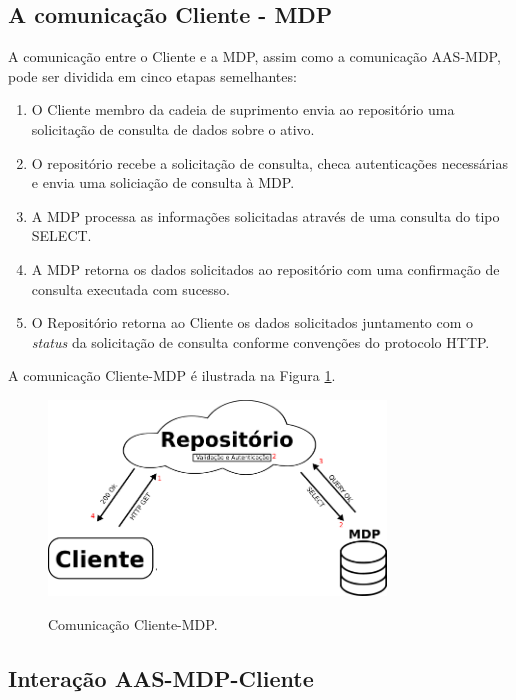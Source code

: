 \documentclass[
	12pt,				%
	oneside,			%
	a4paper,			%
	english,			%
	brazil				%
]{abntex2}
\begin{document}
	
	\subsection{A comunicação Cliente - MDP}
	
	A comunicação entre o Cliente e a MDP, assim como a comunicação AAS-MDP, pode ser dividida em cinco etapas semelhantes:
	
	\begin{enumerate}
		\item O Cliente membro da cadeia de suprimento envia ao repositório uma solicitação de consulta de dados sobre o ativo.
		\item O repositório recebe a solicitação de consulta, checa autenticações necessárias e envia uma soliciação de consulta à MDP.
		\item A MDP processa as informações solicitadas através de uma consulta do tipo SELECT.
		\item A MDP retorna os dados solicitados ao repositório com uma confirmação de consulta executada com sucesso.
		\item O Repositório retorna ao Cliente os dados solicitados juntamento com o \textit{status} da solicitação de consulta conforme convenções do protocolo HTTP.
	\end{enumerate}
	
	
	A comunicação Cliente-MDP é ilustrada na Figura \ref{fig:cliente-mdp}.
	
	\begin{figure}[H]
		\centering
		\caption{Comunicação Cliente-MDP.}
		\includegraphics[width=0.8\textwidth]{cliente-mdp.png}
		\label{fig:cliente-mdp}
	\end{figure}
	
	
	\subsection{Interação AAS-MDP-Cliente}
	
\end{document}
